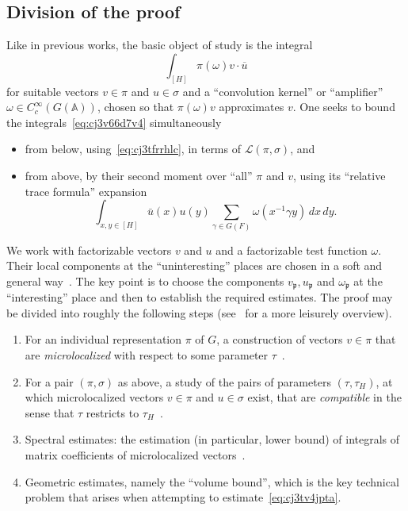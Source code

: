 \documentclass[reqno]{amsart}
\theoremstyle{plain} \newtheorem{theorem} {Theorem} \newtheorem{conjecture} {Conjecture} \newtheorem{corollary} [theorem] {Corollary} \newtheorem{proposition} [theorem] {Proposition} \newtheorem{fact} [theorem] {Fact}
\theoremstyle{definition} \newtheorem{definition} [theorem] {Definition}
\theoremstyle{itplain} %
\begin{document}
\subsection{Division of the proof}\label{sec:cj4vjf3iqs}
Like in previous works, the basic object of study is the integral
\begin{equation}\label{eq:cj3v66d7v4}
  \int_{[H]} \pi(\omega) v \cdot \overline{u}
\end{equation}
for suitable vectors $v \in \pi$ and $u \in \sigma$ and a ``convolution kernel'' or ``amplifier''  $\omega \in C_c^\infty(G(\mathbb{A}))$, chosen so that $\pi(\omega) v$ approximates $v$.  One seeks to bound the integrals~\eqref{eq:cj3v66d7v4} simultaneously
\begin{itemize}
\item from below, using~\eqref{eq:cj3tfrrhlc}, in terms of $\mathcal{L}(\pi,\sigma)$, and 
\item from above, by their second moment  over ``all'' $\pi$ and $v$, using its ``relative trace formula'' expansion
\begin{equation}\label{eq:cj3tv4jpta}
  \int_{x, y \in [H]} \bar{u}(x) u(y) \sum_{\gamma \in G(F)}  \omega (x^{-1} \gamma y) \, d x \, d y.
\end{equation}
\end{itemize}
We work with factorizable vectors $v$ and $u$ and a factorizable test function $\omega$.  Their local components at the ``uninteresting'' places are chosen in a soft and general way~\cite[\S5]{2020arXiv201202187N}.  The key point is to choose the components $v_\mathfrak{p}, u_\mathfrak{p}$ and $\omega_\mathfrak{p}$ at the ``interesting'' place and then to establish the required estimates.  The proof may be divided into roughly the following steps (see~\cite[\S2]{2020arXiv201202187N} for a more leisurely overview).
\begin{enumerate}
\item\label{enumerate:cj3ubymeey} For an individual representation $\pi$ of $G$, a construction of vectors $v \in \pi$ that are \emph{microlocalized} with respect to some parameter $\tau$~\cite[\S1.7]{nelson-venkatesh-1}.
\item\label{enumerate:cj3ubymf5o} For a pair $(\pi,\sigma)$ as above, a study of the pairs of parameters $(\tau, \tau_H)$, at which microlocalized vectors $v \in \pi$ and $u \in \sigma$ exist, that are \emph{compatible} in the sense that $\tau$ restricts to $\tau_H$~\cite[\S13-14]{nelson-venkatesh-1}.
\item\label{enumerate:cj3ubymh5v} Spectral estimates: the estimation (in particular, lower bound) of integrals of matrix coefficients of microlocalized vectors~\cite[\S18]{nelson-venkatesh-1}.
\item\label{enumerate:cj3ubymi4d} Geometric estimates, namely the ``volume bound'', which is the key technical problem that arises when attempting to estimate~\eqref{eq:cj3tv4jpta}.
\end{enumerate}
\end{document}

